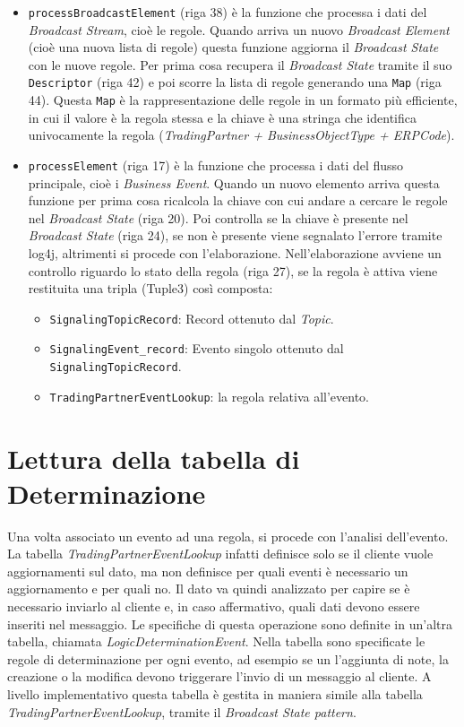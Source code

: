 \begin{itemize}
    \item \texttt{processBroadcastElement} (riga 38) è la funzione che processa i dati del \textit{Broadcast Stream}, cioè le regole.
    Quando arriva un nuovo \textit{Broadcast Element} (cioè una nuova lista di regole) questa funzione aggiorna il \textit{Broadcast State} con le nuove regole.
    Per prima cosa recupera il \textit{Broadcast State} tramite il suo \texttt{Descriptor} (riga 42) e poi scorre la lista di regole generando una \texttt{Map} (riga 44).
    Questa \texttt{Map} è la rappresentazione delle regole in un formato più efficiente, in cui il valore è la regola stessa e la chiave è una stringa che identifica univocamente la regola
    (\textit{TradingPartner + BusinessObjectType + ERPCode}).
    \item \texttt{processElement} (riga 17) è la funzione che processa i dati del flusso principale, cioè i \textit{Business Event}.
    Quando un nuovo elemento arriva questa funzione per prima cosa ricalcola la chiave con cui andare a cercare le regole nel \textit{Broadcast State} (riga 20).
    Poi controlla se la chiave è presente nel \textit{Broadcast State} (riga 24), se non è presente viene segnalato l'errore tramite log4j, altrimenti si procede con l'elaborazione.
    Nell'elaborazione avviene un controllo riguardo lo stato della regola (riga 27), se la regola è attiva viene restituita una tripla (Tuple3) così composta:
    \begin{itemize}
        \item \texttt{SignalingTopicRecord}: Record ottenuto dal \textit{Topic}.
        \item \texttt{SignalingEvent\_record}: Evento singolo ottenuto dal \texttt{Signaling\-Topic\-Record}.
        \item \texttt{TradingPartnerEventLookup}: la regola relativa all'evento.
    \end{itemize}
\end{itemize}

\section{Lettura della tabella di Determinazione}
\label{sec:LetturaDellaTabellaDiDeterminazione}
Una volta associato un evento ad una regola, si procede con l'analisi dell'evento. La tabella \textit{TradingPartnerEventLookup} infatti definisce solo se il cliente vuole aggiornamenti sul dato,
ma non definisce per quali eventi è necessario un aggiornamento e per quali no. 
Il dato va quindi analizzato per capire se è necessario inviarlo al cliente e, in caso affermativo, quali dati devono essere inseriti nel messaggio.
Le specifiche di questa operazione sono definite in un'altra tabella, chiamata \textit{LogicDeterminationEvent}.
Nella tabella sono specificate le regole di determinazione per ogni evento, ad esempio se un l'aggiunta di note, la creazione o la modifica 
devono triggerare l'invio di un messaggio al cliente.
A livello implementativo questa tabella è gestita in maniera simile alla tabella \textit{TradingPartnerEventLookup}, tramite il \textit{Broadcast State pattern}.

